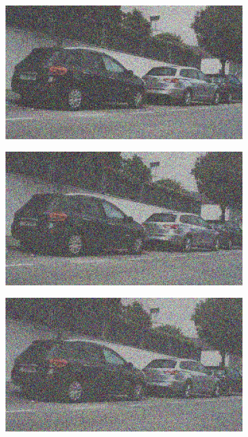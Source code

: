 \documentclass[a4paper]{ctexart}
\begin{document}
\begin{figure}[htbp]
\begin{subfigure}{0.08\textwidth}
			\label{fig：Gamma=0.4, Gauss Noise = 0.7}
		\end{subfigure}
		\begin{subfigure}{0.08\textwidth}
			\captionsetup{font=scriptsize}
			\includegraphics[width=\linewidth]{picture/Edge Detection/degrade/RGB_001 Gamma=0.4, Gauss Noise=0.8}
			\label{fig：Gamma=0.4, Gauss Noise = 0.8}
		\end{subfigure}
		\begin{subfigure}{0.08\textwidth}
			\captionsetup{font=scriptsize}
			\includegraphics[width=\linewidth]{picture/Edge Detection/degrade/RGB_001 Gamma=0.4, Gauss Noise=0.9}
			\label{fig：Gamma=0.4, Gauss Noise = 0.9}
		\end{subfigure}
		\begin{subfigure}{0.08\textwidth}
			\captionsetup{font=scriptsize}
			\includegraphics[width=\linewidth]{picture/Edge Detection/degrade/RGB_001 Gamma=0.4, Gauss Noise=1.0}

\end{subfigure}
\end{figure}
\end{document}
